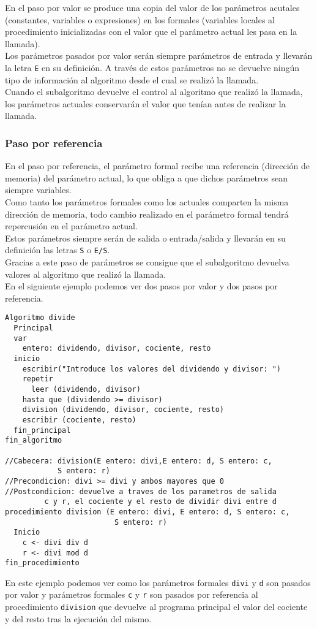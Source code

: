 \documentclass[12pt,letterpaper]{article}
\begin{document}
En el paso por valor se produce una copia del valor de los parámetros acutales (constantes, variables o expresiones) en los formales (variables locales al procedimiento inicializadas con el valor que el parámetro actual les pasa en la llamada).\\
Los parámetros pasados por valor serán siempre parámetros de entrada y llevarán la letra \texttt{E} en su definición. A través de estos parámetros no se devuelve ningún tipo de información al algoritmo desde el cual se realizó la llamada.\\
Cuando el subalgoritmo devuelve el control al algoritmo que realizó la llamada, los parámetros actuales conservarán el valor que tenían antes de realizar la llamada.

\subsubsection{Paso por referencia}
En el paso por referencia, el parámetro formal recibe una referencia (dirección de memoria) del parámetro actual, lo que obliga a que dichos parámetros sean siempre variables.\\
Como tanto los parámetros formales como los actuales comparten la misma dirección de memoria, todo cambio realizado en el parámetro formal tendrá repercusión en el parámetro actual.\\
Estos parámetros siempre serán de salida o entrada/salida y llevarán en su definición las letras \texttt{S} o \texttt{E/S}.\\
Gracias a este paso de parámetros se consigue que el subalgoritmo devuelva valores al algoritmo que realizó la llamada.\\
En el siguiente ejemplo podemos ver dos pasos por valor y dos pasos por referencia.
\begin{lstlisting}
Algoritmo divide
  Principal
  var
    entero: dividendo, divisor, cociente, resto
  inicio
    escribir("Introduce los valores del dividendo y divisor: ")
    repetir
      leer (dividendo, divisor)
    hasta que (dividendo >= divisor)
    division (dividendo, divisor, cociente, resto)
    escribir (cociente, resto)
  fin_principal
fin_algoritmo
	
//Cabecera: division(E entero: divi,E entero: d, S entero: c,
            S entero: r)
//Precondicion: divi >= divi y ambos mayores que 0
//Postcondicion: devuelve a traves de los parametros de salida
         c y r, el cociente y el resto de dividir divi entre d
procedimiento division (E entero: divi, E entero: d, S entero: c,
                         S entero: r)
  Inicio
    c <- divi div d
    r <- divi mod d
fin_procedimiento
\end{lstlisting}
En este ejemplo podemos ver como los parámetros formales \texttt{divi} y \texttt{d} son pasados por valor y parámetros formales \texttt{c} y \texttt{r} son pasados por referencia al procedimiento \texttt{division} que devuelve al programa principal el valor del cociente y del resto tras la ejecución del mismo.
\end{document}
